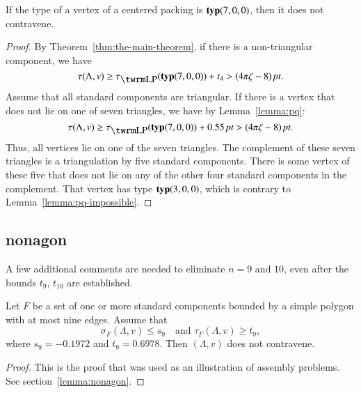 \begin{corollary} \label{lemma:70}
If the type of a vertex of a centered packing is ${\operatorname{\bf typ}}{(7,0,0)}$, then it
does not contravene.
\end{corollary}

\begin{proof} By Theorem~\ref{thm:the-main-theorem},
if there is a non-triangular component, we have
    $$\tau(\Lambda,v)\ge\tlp(\pqr{(7,0,0)})+t_4>\squander.$$
Assume that all standard components are triangular.  If there is a
vertex that does not lie on one of seven triangles, we have by
Lemma~\ref{lemma:pq}:
    $$\tau(\Lambda,v)\ge\tlp(\pqr{(7,0,0)})+0.55\,\pt>\squander.$$
Thus, all vertices lie on one of the seven triangles.  The
complement of these seven triangles is a  triangulation by
five standard components.  There is some vertex of these five that does
not lie on any of the other four standard components in the complement.
That vertex has type ${\operatorname{\bf typ}}{(3,0,0)}$, which is contrary to
Lemma~\ref{lemma:pq-impossible}.
\end{proof}



\subsection{nonagon} %
    \label{sec:nonagon}

A few additional comments are needed to eliminate $n=9$ and $10$,
even after the bounds $t_9$, $t_{10}$ are established.

\begin{lemma} \label{lemma:s9-t9}
Let $F$ be a set of one or more standard components bounded by a simple
polygon with at most nine edges.  Assume  that
    $$\sigma_F(\Lambda,v) \le s_9\quad\text{and }\tau_F(\Lambda,v)\ge t_9,$$
where $s_9=-0.1972$ and $t_9=0.6978$.  Then $(\Lambda,v)$ does not
contravene.
\end{lemma}

\begin{proof} This is the proof that was used as an illustration
of  assembly problems.  See section~\ref{lemma:nonagon}.
\end{proof}


